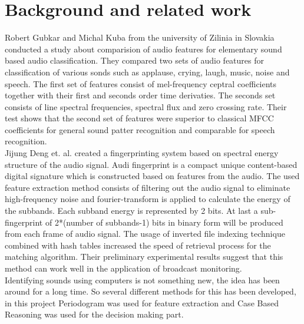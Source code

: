 \section{Background and related work}
Robert Gubkar and Michal Kuba\cite{6566278}  from the university of Zilinia in Slovakia
conducted a study about comparision of audio features for elementary sound
based audio classification. They compared two sets of audio features for classification
of various sonds such as applause, crying, laugh, music, noise and speech.
The first set of features consist of mel-frequency ceptral coefficients together with
their first and seconds order time derivaties. The seconds set consists of line
spectral frequencies, spectral flux and zero crossing rate. Their test shows that
the second set of features were superior to classical MFCC coefficients for general
sound patter recognition and comparable for speech recognition.\\

Jijung Deng et. al.\cite{6138136} created a fingerprinting system based on spectral energy
structure of the audio signal. Audi fingerprint is a compact unique content-based
digital signature which is constructed based on features from the audio.
The used feature extraction method consists of filtering out the audio signal
to eliminate high-frequency noise and fourier-transform is applied to calculate
the energy of the subbands. Each subband energy is represented by 2 bits.
At last a sub-fingerprint of 2*(number of subbands-1) bits in binary form will
be produced from each frame of audio signal. The usage of inverted file
indexing technique combined with hash tables increased the speed of retrieval
process for the matching algorithm. Their preliminary experimental results
suggest that this method can work well in the application of broadcast
monitoring.\\


Identifying sounds using computers is not something new, the idea has been
around for a long time. So several different methods for this has been
developed, in this project Periodogram was used for feature extraction and
Case Based Reasoning was used for the decision making part.\\


